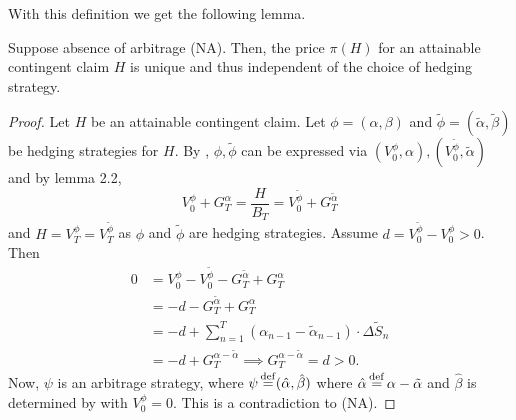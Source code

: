 \documentclass[12pt]{amsart}
\begin{document}
With this definition we get the following lemma.

\begin{lemma}
    Suppose absence of arbitrage (NA). Then, the price \(\pi(H)\) for an attainable contingent claim \(H\) is unique and thus independent of the choice of hedging strategy.
\end{lemma}
\begin{proof}
    Let \(H\) be an attainable contingent claim. Let \(\phi = (\alpha, \beta)\) and \(\tilde{\phi} = (\tilde{\alpha}, \tilde{\beta})\) be hedging strategies for \(H\). By , \(\phi, \tilde{\phi}\) can be expressed via \((V_0^\phi, \alpha), (V_0^{\tilde{\phi}}, \tilde{\alpha})\) and by lemma 2.2, \[
        V_0^\phi + G_T^\alpha = \frac{H}{B_T} = V_0^{\tilde{\phi}} + G_T^{\tilde{\alpha}}
    \]
    and \(H = V_T^\phi = V_T^{\tilde{\phi}}\) as \(\phi\) and \(\tilde{\phi}\) are hedging strategies. Assume \(d = V_0^{\tilde{\phi}} - V_0^\phi > 0\). Then
    \begin{align*}
        0
        &= V_0^\phi - V_0^{\tilde{\phi}} - G_T^{\tilde{\alpha}} + G_T^\alpha\\
        &= -d - G_T^{\tilde{\alpha}} + G_T^{\alpha}\\
        &= -d + \sum_{n=1}^T \left( \alpha_{n-1} - \tilde{\alpha}_{n-1} \right) \cdot \Delta \tilde{S}_{n}\\
        &= -d + G_T^{\alpha-\tilde \alpha} \implies G_T^{\alpha - \tilde \alpha} = d > 0.
    \end{align*}
    Now, \(\psi\) is an arbitrage strategy, where \(\psi \operatorname*{\stackrel{\operatorname{def}}{=}} (\hat{\alpha}, \hat{\beta})\) where \(\hat{\alpha} \operatorname*{\stackrel{\operatorname{def}}{=}} \alpha - \tilde{\alpha}\) and \(\hat{\beta}\) is determined by  with \(V_0^\phi = 0\). This is a contradiction to (NA).
\end{proof}
\end{document}
